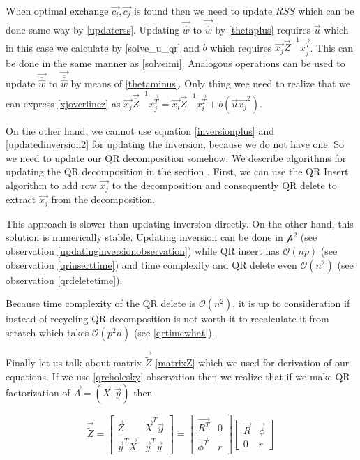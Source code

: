 When optimal exchange $\vec{c_i}, \vec{c_j}$ is found then we need to update $RSS$ which can be done same way by \eqref{updaterss}. Updating $\vec{\hat{w}}$ to  $\vec{\overline{\hat{w}}}$ by \eqref{thetaplus} requires
$\vec{u}$  which in this case we calculate by \eqref{solve_u_qr} and $b$ which requires  $\vec{x_j}\vec{Z}^{-1}\vec{x_j^T}$. This can be done in the same manner as \eqref{solveimi}. Analogous operations can be used to update $\vec{\overline{\hat{w}}}$ to $\vec{\overline{\overline{\hat{w}}}}$  by means of \eqref{thetaminus}. Only thing wee need to realize that we can express \eqref{xjoverlinez} as $\vec{x_j}\vec{\overline{{Z}}}^{-1}\vec{x_j^T} = \vec{x_i}\vec{{{Z}}}^{-1}\vec{x_i^T} + b(\vec{u}\vec{x_j}^2)$.

On the other hand, we cannot use equation \eqref{inversionplus} and \eqref{updatedinversion2} for updating the inversion, because we do not have one. So we need to update our QR decomposition somehow. 
We describe algorithms for updating the QR decomposition in the section . 
First, we can use the QR Insert algorithm to add row $\vec{x_j}$ to the decomposition and consequently QR delete to extract $\vec{x_j}$  from the decomposition. 

\begin{observation}
This approach is slower than updating inversion directly. On the other hand, this solution is numerically stable. Updating inversion can be done in $\mathcal{p^2}$ (see observation \ref{updatinginversionobservation})  while QR insert has $\mathcal{O}(np)$ (see observation \ref{qrinserttime}) and time complexity and QR delete even $\mathcal{O}(n^2)$ (see observation \ref{qrdeletetime}).
\end{observation}

\begin{note}
Because time complexity of the QR delete is $\mathcal{O}(n^2)$, it is up to consideration if instead of recycling QR decomposition is not worth it to recalculate it from scratch which takes $\mathcal{O}(p^2n)$ (see \eqref{qrtimewhat}).
\end{note}


Finally let us talk about matrix $\vec{\tilde{Z}}$ \eqref{matrixZ} which we used for derivation of our equations. If we use \ref{qrcholesky} observation then we realize that if we make QR factorization of $\vec{A} = (\vec{X}, \vec{y})$ then

\begin{equation}
    \vec{\tilde{Z}} = 
    \begin{bmatrix}
        \vec{Z} & \vec{X}^T\vec{y} \\
    \vec{y}^T\vec{X} & \vec{y}^T\vec{y}
    \end{bmatrix} 
    = 
    \begin{bmatrix}
        \vec{R^T} & 0 \\
    \vec{\phi^T} & r
    \end{bmatrix} 
    \begin{bmatrix} 
        \vec{R} & \vec{\phi} \\
     0 & r
    \end{bmatrix} 
\end{equation}

